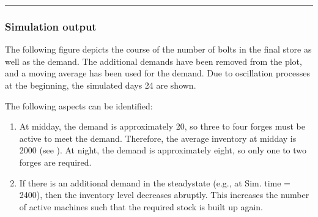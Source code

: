 \documentclass[letterpaper,10pt,english]{sphinxmanual}
\begin{document}
\begin{sphinxVerbatim}[commandchars=\\\{\}]
       
           

     

      

      

     
\end{sphinxVerbatim}


\bigskip\hrule\bigskip



\subsubsection{Simulation output}
\label{\detokenize{source/Examples/example03:simulation-output}}\label{\detokenize{source/Examples/example03:output2}}
\sphinxAtStartPar
The following figure depicts the course of the number of bolts in the final store as well as the demand. The additional
demands have been removed from the plot, and a moving average has been used for the demand. Due to oscillation processes
at the beginning, the simulated days 2\textendash{}4 are shown.

\sphinxAtStartPar
The following aspects can be identified:
\begin{enumerate}
%
\item {} 
\sphinxAtStartPar
At midday, the demand is approximately 20, so three to four forges must be active to meet the demand. Therefore, the
average inventory at midday is 2000 (see {\hyperref[\detokenize{source/Examples/example03:global1}]{}}). At night, the demand is approximately
eight, so only one to two forges are required.

\item {} 
\sphinxAtStartPar
If there is an additional demand in the steady\sphinxhyphen{}state (e.g., at Sim. time = 2400), then the inventory level decreases
abruptly. This increases the number of active machines such that the required stock is built up again.

\end{enumerate}
\end{document}
